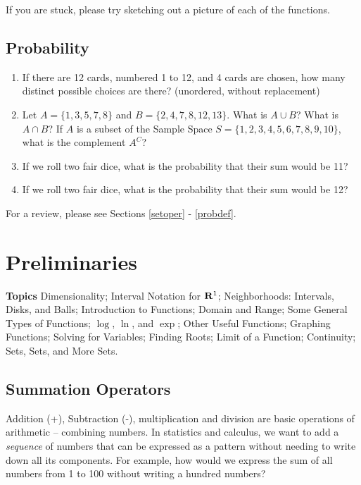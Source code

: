 \documentclass[
]{book}
\providecommand{\tightlist}{%
  \setlength{\itemsep}{0pt}\setlength{\parskip}{0pt}}
\theoremstyle{definition}
\theoremstyle{definition}
\theoremstyle{definition}
\theoremstyle{definition}
\theoremstyle{remark}
\begin{document}
If you are stuck, please try sketching out a picture of each of the functions.

\hypertarget{probability}{%
\section*{Probability}\label{probability}}

\begin{enumerate}
\def\labelenumi{\arabic{enumi}.}
\tightlist
\item
  If there are 12 cards, numbered 1 to 12, and 4 cards are chosen, how many distinct possible choices are there? (unordered, without replacement)
\item
  Let \(A = \{1,3,5,7,8\}\) and \(B = \{2,4,7,8,12,13\}\). What is \(A \cup B\)? What is \(A \cap B\)? If \(A\) is a subset of the Sample Space \(S = \{1,2,3,4,5,6,7,8,9,10\}\), what is the complement \(A^C\)?
\item
  If we roll two fair dice, what is the probability that their sum would be 11?
\item
  If we roll two fair dice, what is the probability that their sum would be 12?
\end{enumerate}

For a review, please see Sections \ref{setoper} - \ref{probdef}.

\hypertarget{preliminaries}{%
\chapter{Preliminaries}\label{preliminaries}}

\textbf{Topics}
Dimensionality;
Interval Notation for \({\bf R}^1\);
Neighborhoods: Intervals, Disks, and Balls; Introduction to Functions;
Domain and Range;
Some General Types of Functions;
\(\log\), \(\ln\), and \(\exp\);
Other Useful Functions;
Graphing Functions;
Solving for Variables;
Finding Roots;
Limit of a Function;
Continuity; Sets, Sets, and More Sets.

\hypertarget{sum-notation}{%
\section{Summation Operators}\label{sum-notation}}

Addition (+), Subtraction (-), multiplication and division are basic operations of arithmetic -- combining numbers. In statistics and calculus, we want to add a \emph{sequence} of numbers that can be expressed as a pattern without needing to write down all its components. For example, how would we express the sum of all numbers from 1 to 100 without writing a hundred numbers?
\end{document}
